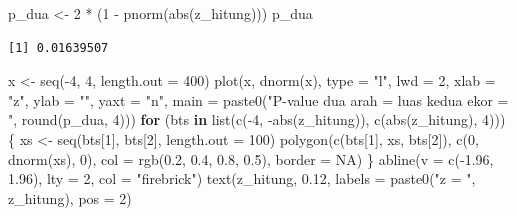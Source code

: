 \documentclass[
  indonesian,
  letterpaper,
]{book}
\newenvironment{Shaded}{\begin{snugshade}}{\end{snugshade}}
\newcommand{\AttributeTok}[1]{\textcolor[rgb]{0.40,0.45,0.13}{#1}}
\newcommand{\ConstantTok}[1]{\textcolor[rgb]{0.56,0.35,0.01}{#1}}
\newcommand{\ControlFlowTok}[1]{\textcolor[rgb]{0.00,0.23,0.31}{\textbf{#1}}}
\newcommand{\DecValTok}[1]{\textcolor[rgb]{0.68,0.00,0.00}{#1}}
\newcommand{\FloatTok}[1]{\textcolor[rgb]{0.68,0.00,0.00}{#1}}
\newcommand{\FunctionTok}[1]{\textcolor[rgb]{0.28,0.35,0.67}{#1}}
\newcommand{\NormalTok}[1]{\textcolor[rgb]{0.00,0.23,0.31}{#1}}
\newcommand{\OtherTok}[1]{\textcolor[rgb]{0.00,0.23,0.31}{#1}}
\newcommand{\SpecialCharTok}[1]{\textcolor[rgb]{0.37,0.37,0.37}{#1}}
\newcommand{\StringTok}[1]{\textcolor[rgb]{0.13,0.47,0.30}{#1}}
\begin{document}
\begin{Shaded}
\begin{Highlighting}[]
\NormalTok{p\_dua }\OtherTok{\textless{}{-}} \DecValTok{2} \SpecialCharTok{*}\NormalTok{ (}\DecValTok{1} \SpecialCharTok{{-}} \FunctionTok{pnorm}\NormalTok{(}\FunctionTok{abs}\NormalTok{(z\_hitung)))}
\NormalTok{p\_dua}
\end{Highlighting}
\end{Shaded}

\begin{verbatim}
[1] 0.01639507
\end{verbatim}

\begin{Shaded}
\begin{Highlighting}[]
\NormalTok{x }\OtherTok{\textless{}{-}} \FunctionTok{seq}\NormalTok{(}\SpecialCharTok{{-}}\DecValTok{4}\NormalTok{, }\DecValTok{4}\NormalTok{, }\AttributeTok{length.out =} \DecValTok{400}\NormalTok{)}
\FunctionTok{plot}\NormalTok{(x, }\FunctionTok{dnorm}\NormalTok{(x), }\AttributeTok{type =} \StringTok{"l"}\NormalTok{, }\AttributeTok{lwd =} \DecValTok{2}\NormalTok{, }\AttributeTok{xlab =} \StringTok{"z"}\NormalTok{, }\AttributeTok{ylab =} \StringTok{""}\NormalTok{, }\AttributeTok{yaxt =} \StringTok{"n"}\NormalTok{,}
     \AttributeTok{main =} \FunctionTok{paste0}\NormalTok{(}\StringTok{"P{-}value dua arah = luas kedua ekor = "}\NormalTok{, }\FunctionTok{round}\NormalTok{(p\_dua, }\DecValTok{4}\NormalTok{)))}
\ControlFlowTok{for}\NormalTok{ (bts }\ControlFlowTok{in} \FunctionTok{list}\NormalTok{(}\FunctionTok{c}\NormalTok{(}\SpecialCharTok{{-}}\DecValTok{4}\NormalTok{, }\SpecialCharTok{{-}}\FunctionTok{abs}\NormalTok{(z\_hitung)), }\FunctionTok{c}\NormalTok{(}\FunctionTok{abs}\NormalTok{(z\_hitung), }\DecValTok{4}\NormalTok{))) \{}
\NormalTok{  xs }\OtherTok{\textless{}{-}} \FunctionTok{seq}\NormalTok{(bts[}\DecValTok{1}\NormalTok{], bts[}\DecValTok{2}\NormalTok{], }\AttributeTok{length.out =} \DecValTok{100}\NormalTok{)}
  \FunctionTok{polygon}\NormalTok{(}\FunctionTok{c}\NormalTok{(bts[}\DecValTok{1}\NormalTok{], xs, bts[}\DecValTok{2}\NormalTok{]), }\FunctionTok{c}\NormalTok{(}\DecValTok{0}\NormalTok{, }\FunctionTok{dnorm}\NormalTok{(xs), }\DecValTok{0}\NormalTok{), }\AttributeTok{col =} \FunctionTok{rgb}\NormalTok{(}\FloatTok{0.2}\NormalTok{, }\FloatTok{0.4}\NormalTok{, }\FloatTok{0.8}\NormalTok{, }\FloatTok{0.5}\NormalTok{), }\AttributeTok{border =} \ConstantTok{NA}\NormalTok{)}
\NormalTok{\}}
\FunctionTok{abline}\NormalTok{(}\AttributeTok{v =} \FunctionTok{c}\NormalTok{(}\SpecialCharTok{{-}}\FloatTok{1.96}\NormalTok{, }\FloatTok{1.96}\NormalTok{), }\AttributeTok{lty =} \DecValTok{2}\NormalTok{, }\AttributeTok{col =} \StringTok{"firebrick"}\NormalTok{)}
\FunctionTok{text}\NormalTok{(z\_hitung, }\FloatTok{0.12}\NormalTok{, }\AttributeTok{labels =} \FunctionTok{paste0}\NormalTok{(}\StringTok{"z = "}\NormalTok{, z\_hitung), }\AttributeTok{pos =} \DecValTok{2}\NormalTok{)}
\end{Highlighting}
\end{Shaded}
\end{document}
